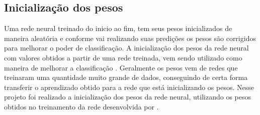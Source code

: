 \subsection{Inicialização dos pesos}
Uma rede neural treinado do inicio ao fim, tem seus pesos inicializados de maneira aleatória e conforme vai realizando suas predições os pesos são corrigidos para melhorar o poder de classificação. A inicialização dos pesos da rede neural com valores obtidos a partir de uma rede treinada, vem sendo utilizado como maneira de melhorar a classificação \cite{Girshick_2014_CVPR}. Geralmente os pesos vem de redes que treinaram uma quantidade muito grande de dados, conseguindo de certa forma transferir o aprendizado obtido para a rede que está inicializando os pesos. Nesse projeto foi realizado a inicialização dos pesos da rede neural, utilizando os pesos obtidos no treinamento da rede desenvolvida por .




